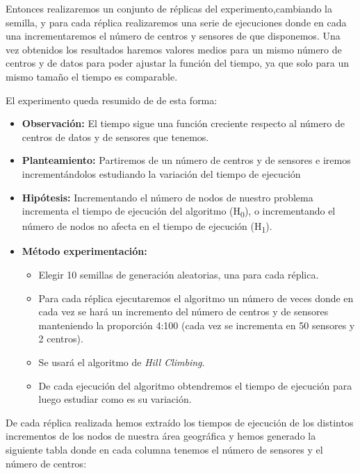\documentclass{article}
\begin{document}
\begin{enumerate}
  Entonces realizaremos un conjunto de réplicas del experimento,cambiando la semilla, y para cada réplica realizaremos una serie de ejecuciones donde en cada una incrementaremos el número de centros y sensores de que disponemos.
  Una vez obtenidos los resultados haremos valores medios para un mismo número de centros y de datos para poder ajustar la función del tiempo, ya que solo para un mismo tamaño el tiempo es comparable.

  El experimento queda resumido de de esta forma:

  \begin{itemize}
    \item \textbf{Observación:} El tiempo sigue una función creciente respecto al número de centros de datos y de sensores que tenemos.
    \item \textbf{Planteamiento:} Partiremos de un número de centros y de sensores e iremos incrementándolos estudiando la variación del tiempo de ejecución
    \item \textbf{Hipótesis:} Incrementando el número de nodos de nuestro problema incrementa el tiempo de ejecución del algoritmo (H\textsubscript{0}), o incrementando el número de nodos no afecta en el tiempo de ejecución (H\textsubscript{1}).
    \item \textbf{Método experimentación:}
    \begin{itemize}
      \item Elegir 10 semillas de generación aleatorias, una para cada réplica.
      \item Para cada réplica ejecutaremos el algoritmo un número de veces donde en cada vez se hará un incremento del número de centros y de sensores manteniendo la proporción 4:100 (cada vez se incrementa en 50 sensores y 2 centros).
      \item Se usará el algoritmo de \textit{Hill Climbing}.
      \item De cada ejecución del algoritmo obtendremos el tiempo de ejecución para luego estudiar como es su variación.
    \end{itemize}
  \end{itemize}

  De cada réplica realizada hemos extraído los tiempos de ejecución de los distintos incrementos de los nodos de nuestra área geográfica y hemos generado la siguiente tabla donde en cada columna tenemos el número de sensores y el número de centros:


\end{enumerate}
\end{document}
